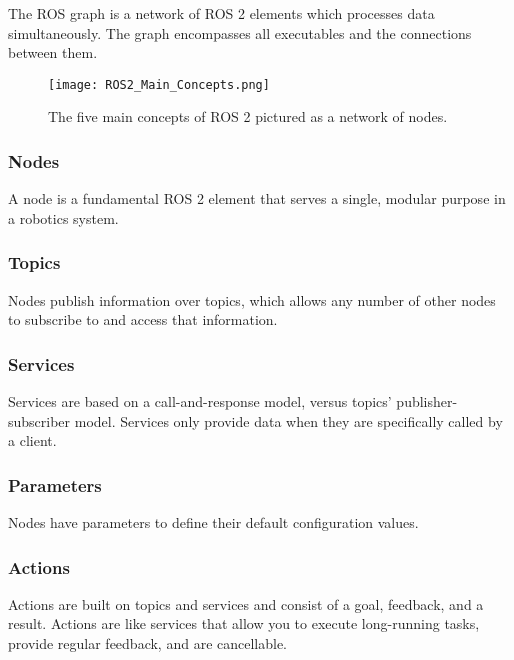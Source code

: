 The ROS graph is a network of ROS 2 elements which processes data simultaneously. The graph encompasses all executables and the connections between them.

\begin{figure}[H]
    \centering
    \texttt{[image: ROS2\_Main\_Concepts.png]}
    \caption{The five main concepts of ROS 2 pictured as a network of nodes.}
    \label{fig:ROS 2 main concepts}
\end{figure}

\subsubsection{Nodes}
A node is a fundamental ROS 2 element that serves a single, modular purpose in a robotics system. %

\subsubsection{Topics}
 Nodes publish information over topics, which allows any number of other nodes to subscribe to and access that information. %

\subsubsection{Services}
Services are based on a call-and-response model, versus topics’ publisher-subscriber model. Services only provide data when they are specifically called by a client. %

\subsubsection{Parameters}
Nodes have parameters to define their default configuration values. %

\subsubsection{Actions}
Actions are built on topics and services and consist of a goal, feedback, and a result. Actions are like services that allow you to execute long-running tasks, provide regular feedback, and are cancellable. %

